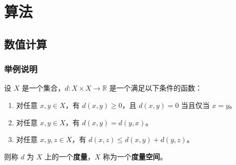 \documentclass[12pt, a4paper, oneside, UTF8]{ctexbook}
\begin{document}
	\else
	\fi
	\part{算法}
	\chapter{数值计算}
	
	\section{举例说明}
	
	\begin{defn}
		设 $X$ 是一个集合，$d: X \times X \to \mathbb{R}$ 是一个满足以下条件的函数：
		\begin{enumerate}
			\item 对任意 $x, y \in X$，有 $d(x, y) \geq 0$，且 $d(x, y) = 0$ 当且仅当 $x = y$。
			\item 对任意 $x, y \in X$，有 $d(x, y) = d(y, x)$。
			\item 对任意 $x, y, z \in X$，有 $d(x, z) \leq d(x, y) + d(y, z)$。
		\end{enumerate}
		则称 $d$ 为 $X$ 上的一个\textbf{度量}，$X$ 称为一个\textbf{度量空间}。
	\end{defn}
	
	\ifx\allfiles\undefined
\end{document}
